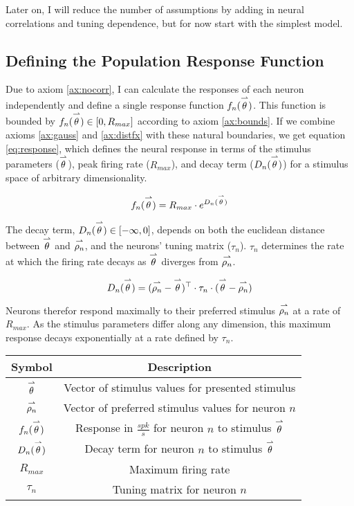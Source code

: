 Later on, I will reduce the number of assumptions by adding in neural correlations and tuning dependence, but for now start with the simplest model. 

\subsection*{Defining the Population Response Function}

Due to axiom \ref{ax:nocorr}, I can calculate the responses of each neuron independently and define a single response function $f_n(\overset{\rightharpoonup}\theta)$. This function is bounded by $f_n(\overset{\rightharpoonup}\theta) \in [0, R_{max}]$ according to axiom \ref{ax:bounds}. If we combine axioms \ref{ax:gauss} and \ref{ax:distfx} with these natural boundaries, we get equation \ref{eq:response}, which defines the neural response in terms of the stimulus parameters ($\overset{\rightharpoonup}\theta$), peak firing rate ($R_{max}$), and decay term ($D_n(\overset{\rightharpoonup}\theta)$) for a stimulus space of arbitrary dimensionality.

\begin{equation}
	\label{eq:response}
	f_n(\overset{\rightharpoonup}{\theta}) = R_{max} \cdot e^{D_n(\overset{\rightharpoonup}\theta)}
\end{equation}

The decay term, ${D_n(\overset{\rightharpoonup}\theta)} \in [-\infty, 0]$, depends on both the euclidean distance between $\overset{\rightharpoonup}\theta$ and $\overset{\rightharpoonup}{\rho_n}$, and the neurons' tuning matrix ($\tau_n$). $\tau_n$ determines the rate at which the firing rate decays as $\overset{\rightharpoonup}\theta$ diverges from $\overset{\rightharpoonup}{\rho_n}$.

\begin{equation}
	\label{eq:decay}
	D_n(\overset{\rightharpoonup}\theta) = (\overset{\rightharpoonup}{\rho_n} -\overset{\rightharpoonup}\theta)^\top \cdot \tau_n \cdot (\overset{\rightharpoonup}\theta-\overset{\rightharpoonup}{\rho_n})
\end{equation}

Neurons therefor respond maximally to their preferred stimulus $\overset{\rightharpoonup}{\rho_n}$ at a rate of $R_{max}$. As the stimulus parameters differ along any dimension, this maximum response decays exponentially at a rate defined by $\tau_n$.

\begin{table}
	\centering
	\begin{tabular}{|c|c|}
		\hline
		\textbf{Symbol}       & \textbf{Description} \\
		\hline
		$\overset{\rightharpoonup}\theta$      & Vector of stimulus values for presented stimulus \\
		$\overset{\rightharpoonup}{\rho_n}$    & Vector of preferred stimulus values for neuron $n$ \\
		$f_n(\overset{\rightharpoonup}\theta)$ & Response in $\frac{spk}{s}$ for neuron $n$ to stimulus $\overset{\rightharpoonup}\theta$ \\
		$D_n(\overset{\rightharpoonup}\theta)$ & Decay term for neuron $n$ to stimulus $\overset{\rightharpoonup}\theta$ \\
		$R_{max}$             & Maximum firing rate \\
		$\tau_n$              & Tuning matrix for neuron $n$ \\
		\hline
	\end{tabular}
	\label{tbl:symbols}
\end{table}


